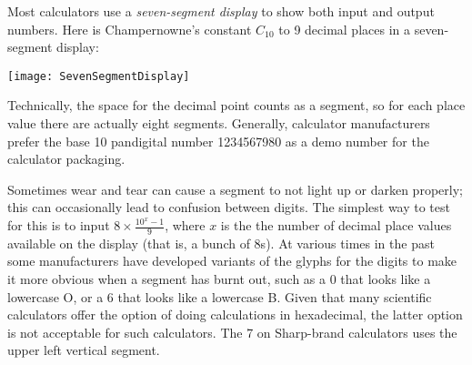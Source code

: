 \documentclass[12pt]{article}
\begin{document}
Most calculators use a {\em seven-segment display} to show both input and output numbers. Here is Champernowne's constant $C_{10}$ to 9 decimal places in a seven-segment display:

\begin{center}
\texttt{[image: SevenSegmentDisplay]}
\end{center}

Technically, the space for the decimal point counts as a segment, so for each place value there are actually eight segments. Generally, calculator manufacturers prefer the base 10 pandigital number 1234567980 as a demo number for the calculator packaging.

Sometimes wear and tear can cause a segment to not light up or darken properly; this can occasionally lead to confusion between digits. The simplest way to test for this is to input $8 \times \frac{10^x - 1}{9}$, where $x$ is the the number of decimal place values available on the display (that is, a bunch of 8s). At various times in the past some manufacturers have developed variants of the glyphs for the digits to make it more obvious when a segment has burnt out, such as a 0 that looks like a lowercase O, or a 6 that looks like a lowercase B. Given that many scientific calculators offer the option of doing calculations in hexadecimal, the latter option is not acceptable for such calculators. The 7 on Sharp-brand calculators uses the upper left vertical segment.
\end{document}
